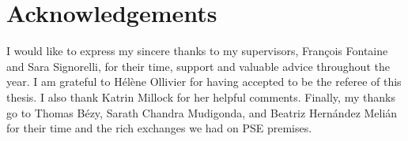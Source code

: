 \chapter*{Acknowledgements} %
\justify


I would like to express my sincere thanks to my supervisors, François Fontaine and Sara Signorelli, for their time, support and valuable advice throughout the year. I am grateful
to Hélène Ollivier for having accepted to be the referee of this thesis. I also thank Katrin
Millock for her helpful comments. Finally, my thanks go to Thomas Bézy, Sarath Chandra Mudigonda, and Beatriz Hernández Melián for their time and the rich exchanges we had on PSE premises.



